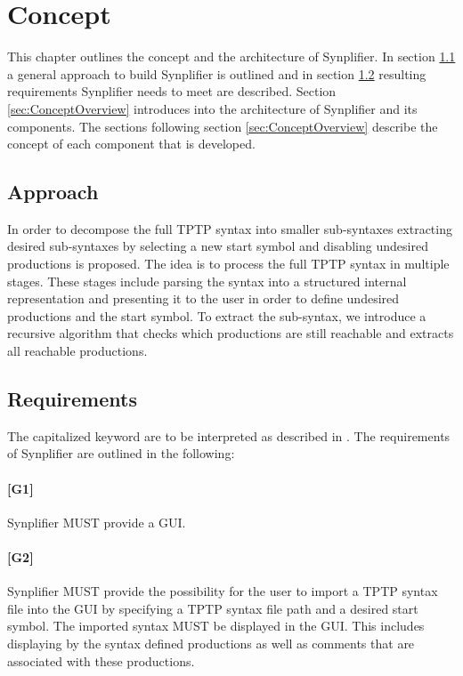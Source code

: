 
\chapter{Concept}\label{cha:Concept}
This chapter outlines the concept and the architecture of \ac{Synplifier}. In section \ref{sec:ConceptApproach} a general approach to build \ac{Synplifier} is outlined and in section \ref{sec:ConceptRequirements} resulting requirements \ac{Synplifier} needs to meet are described.
Section \ref{sec:ConceptOverview} introduces into the architecture of \ac{Synplifier} and its components.
The sections following section \ref{sec:ConceptOverview} describe the concept of each component that is developed.

\section{Approach}\label{sec:ConceptApproach}

In order to decompose the full \ac{TPTP} syntax into smaller sub-syntaxes extracting desired sub-syntaxes by selecting a new start symbol and disabling undesired productions is proposed.
The idea is to process the full \ac{TPTP} syntax in multiple stages.
These stages include parsing the syntax into a structured internal representation and presenting it to the user in order to define undesired productions and the start symbol. To extract the sub-syntax, we introduce a recursive algorithm that checks which productions are still reachable and extracts all reachable
productions.

\section{Requirements}\label{sec:ConceptRequirements}

The capitalized keyword are to be interpreted as described in \cite{Bradner.1997}.
The requirements of \ac{Synplifier} are outlined in the following:\\
\subsubsection{[G1]}\label{G1}
\ac{Synplifier} MUST provide a GUI.
\subsubsection{[G2]}\label{G2}
\ac{Synplifier} MUST provide the possibility for the user to import a \ac{TPTP} syntax file into the GUI by specifying a \ac{TPTP} syntax file path and a desired start symbol. The imported syntax MUST be displayed in the GUI. This includes displaying by the syntax defined productions as well as comments that are associated with these productions.
